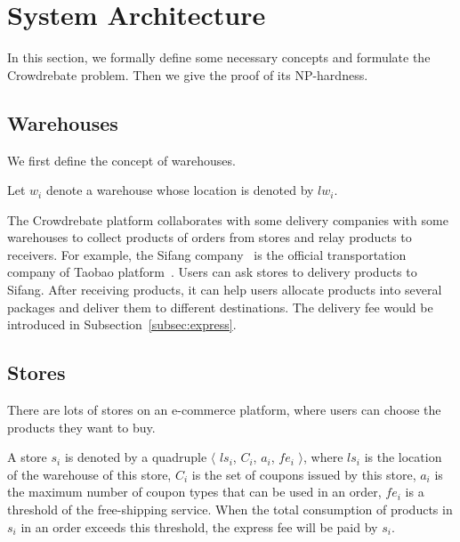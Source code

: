 \section{System Architecture}
\label{sec:problemDefinition}
In this section, we formally define some necessary concepts and formulate the Crowdrebate problem. Then we give the proof of its NP-hardness.

\subsection{Warehouses}
\label{subsec:warehouse}
We first define the concept of warehouses.

\begin{definition}[A Warehouse]
	Let $w_i$ denote a warehouse whose location is denoted by $lw_i$.
\end{definition}

The Crowdrebate platform collaborates with some delivery companies with some warehouses to collect products of orders from stores and relay products to receivers. For example, the Sifang company~\cite{Sifang} is the official transportation company of Taobao platform~\cite{Taobao}. Users can ask stores to delivery products to Sifang. After receiving products, it can help users allocate products into several packages and deliver them to different destinations. The delivery fee would be introduced in Subsection~\ref{subsec:express}. 

\subsection{Stores}
\label{subsec:store}
There are lots of stores on an e-commerce platform, where users can choose the products they want to buy.

\begin{definition}[A Store]
	\label{def:store}
A store $s_i$ is denoted by a quadruple $\langle$ $ls_i$, $C_i$, $a_i$, $fe_i$ $\rangle$, where $ls_i$ is the location of the warehouse of this store, $C_i$ is the set of coupons issued by this store, $a_i$ is the maximum number of coupon types that can be used in an order, $fe_i$ is a threshold of the free-shipping service. When the total consumption of products in $s_i$ in an order exceeds this threshold, the express fee will be paid by $s_i$.
\end{definition}

